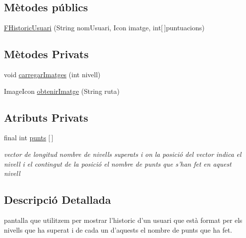 \subsection*{Mètodes públics}
\begin{DoxyCompactItemize}
\item 
\hyperlink{classinterficie_1_1_f_historic_usuari_a7dae2cb499c3aeade25895dcbfd42c24}{F\+Historic\+Usuari} (String nom\+Usuari, Icon imatge, int\mbox{[}$\,$\mbox{]}puntuacions)
\end{DoxyCompactItemize}
\subsection*{Mètodes Privats}
\begin{DoxyCompactItemize}
\item 
void \hyperlink{classinterficie_1_1_f_historic_usuari_a3e73a03f41c8150660a7451df269cb7e}{carregar\+Imatges} (int nivell)
\item 
Image\+Icon \hyperlink{classinterficie_1_1_f_historic_usuari_a058499e3b80b85be73abf48df14e0838}{obtenir\+Imatge} (String ruta)
\end{DoxyCompactItemize}
\subsection*{Atributs Privats}
\begin{DoxyCompactItemize}
\item 
\hypertarget{classinterficie_1_1_f_historic_usuari_a827d72eacf4ede6d801532681f2a507c}{final int \hyperlink{classinterficie_1_1_f_historic_usuari_a827d72eacf4ede6d801532681f2a507c}{punts} \mbox{[}$\,$\mbox{]}}\label{classinterficie_1_1_f_historic_usuari_a827d72eacf4ede6d801532681f2a507c}

\begin{DoxyCompactList}\small\item\em vector de longitud nombre de nivells superats i on la posició del vector indica el nivell i el contingut de la posició el nombre de punts que s'han fet en aquest nivell \end{DoxyCompactList}\end{DoxyCompactItemize}


\subsection{Descripció Detallada}
pantalla que utilitzem per mostrar l'historic d'un usuari que està format per els nivells que ha superat i de cada un d'aquests el nombre de punts que ha fet. 

